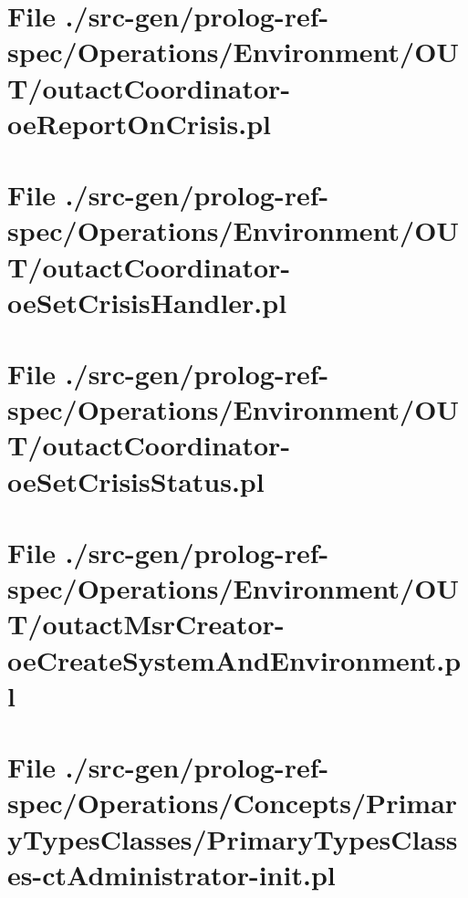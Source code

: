 \section[File /src-gen/prolog-ref-spec.../outactCoordinator-oeReportOnCrisis.pl]{File ./src-gen/prolog-ref-spec/Operations/Environment/OUT/outactCoordinator-oeReportOnCrisis.pl}
\scriptsize

\normalsize
	
\section[File /src-gen/prolog-ref-spec.../outactCoordinator-oeSetCrisisHandler.pl]{File ./src-gen/prolog-ref-spec/Operations/Environment/OUT/outactCoordinator-oeSetCrisisHandler.pl}
\scriptsize

\normalsize
	
\section[File /src-gen/prolog-ref-spec.../outactCoordinator-oeSetCrisisStatus.pl]{File ./src-gen/prolog-ref-spec/Operations/Environment/OUT/outactCoordinator-oeSetCrisisStatus.pl}
\scriptsize

\normalsize
	
\section[File /src-gen.../outactMsrCreator-oeCreateSystemAndEnvironment.pl]{File ./src-gen/prolog-ref-spec/Operations/Environment/OUT/outactMsrCreator-oeCreateSystemAndEnvironment.pl}
\scriptsize

\normalsize
	
\section[File /src-gen/prolog-ref-spec.../PrimaryTypesClasses-ctAdministrator-init.pl]{File ./src-gen/prolog-ref-spec/Operations/Concepts/PrimaryTypesClasses/PrimaryTypesClasses-ctAdministrator-init.pl}
\scriptsize

\normalsize
	
